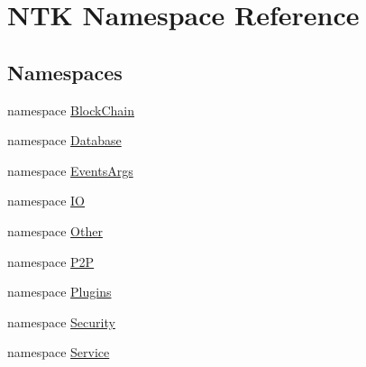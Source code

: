 \hypertarget{namespace_n_t_k}{}\section{N\+TK Namespace Reference}
\label{namespace_n_t_k}
\subsection*{Namespaces}
\begin{DoxyCompactItemize}
\item 
namespace \mbox{\hyperlink{namespace_n_t_k_1_1_block_chain}{Block\+Chain}}
\item 
namespace \mbox{\hyperlink{namespace_n_t_k_1_1_database}{Database}}
\item 
namespace \mbox{\hyperlink{namespace_n_t_k_1_1_events_args}{Events\+Args}}
\item 
namespace \mbox{\hyperlink{namespace_n_t_k_1_1_i_o}{IO}}
\item 
namespace \mbox{\hyperlink{namespace_n_t_k_1_1_other}{Other}}
\item 
namespace \mbox{\hyperlink{namespace_n_t_k_1_1_p2_p}{P2P}}
\item 
namespace \mbox{\hyperlink{namespace_n_t_k_1_1_plugins}{Plugins}}
\item 
namespace \mbox{\hyperlink{namespace_n_t_k_1_1_security}{Security}}
\item 
namespace \mbox{\hyperlink{namespace_n_t_k_1_1_service}{Service}}
\end{DoxyCompactItemize}

